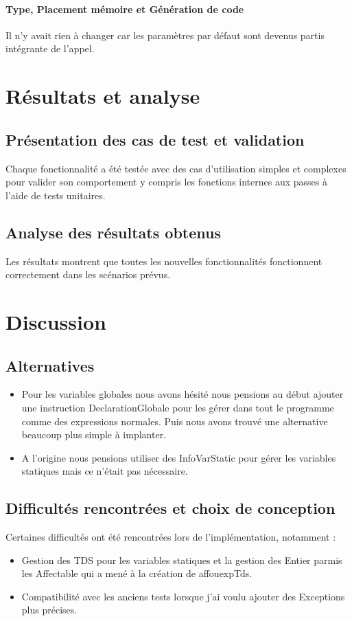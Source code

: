 \documentclass[a4paper,12pt]{article}
\begin{document}
\paragraph{Type, Placement mémoire et Génération de code}
Il n'y avait rien à changer car les paramètres par défaut sont devenus partis intégrante de l'appel.


\section{R\'esultats et analyse}
\subsection{Pr\'esentation des cas de test et validation}
Chaque fonctionnalit\'e a \'et\'e test\'ee avec des cas d'utilisation simples et complexes pour valider son comportement y compris les fonctions internes aux passes à l'aide de tests unitaires.

\subsection{Analyse des r\'esultats obtenus}
Les r\'esultats montrent que toutes les nouvelles fonctionnalit\'es fonctionnent correctement dans les sc\'enarios pr\'evus.

\section{Discussion}
\subsection{Alternatives}
\begin{itemize}
\item Pour les variables globales nous avons hésité nous pensions au début ajouter une instruction DeclarationGlobale pour les gérer dans tout le programme comme des expressions normales. Puis nous avons trouvé une alternative beaucoup plus simple à implanter.

\item A l'origine nous pensions utiliser des InfoVarStatic pour gérer les variables statiques mais ce n'était pas nécessaire.

\end{itemize}

\subsection{Difficult\'es rencontr\'ees et choix de conception}
Certaines difficult\'es ont \'et\'e rencontr\'ees lors de l'impl\'ementation, notamment :
\begin{itemize}
    \item Gestion des TDS pour les variables statiques et la gestion des Entier parmis les Affectable qui a mené à la création de affouexpTds.
    \item Compatibilit\'e avec les anciens tests lorsque j'ai voulu ajouter des Exceptions plus précises.
\end{itemize}
\end{document}
